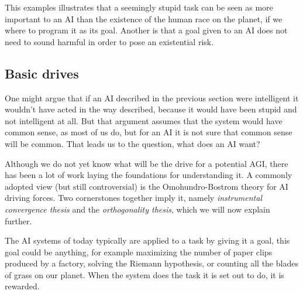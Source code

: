 \documentclass[12pt,A4]{report}
\theoremstyle{definition}
\begin{document}
This examples illustrates that a seemingly stupid task can be seen as more important to an AI than the existence of the human race on the planet, if we where to program it as its goal. Another is that a goal given to an AI does not need to sound harmful in order to pose an existential risk. 

\subsection{Basic drives}
One might argue that if an AI described in the previous section were intelligent it wouldn't have acted in the way described, because it would have been stupid and not intelligent at all. But that argument assumes that the system would have common sense, as most of us do, but for an AI it is not sure that common sense will be common. That leads us to the question, what does an AI want?

Although we do not yet know what will be the drive for a potential AGI, there has been a lot of work laying the foundations for understanding it. A commonly adopted view (but still controversial) is the Omohundro-Bostrom theory for AI driving forces. Two cornerstones together imply it, namely \textit{instrumental convergence thesis} and the \textit{orthogonality thesis}, which we will now explain further.

The AI systems of today typically are applied to a task by giving it a goal, this goal could be anything, for example maximizing the number of paper clips produced by a factory, solving the Riemann hypothesis, or counting all the blades of grass on our planet. When the system does the task it is set out to do, it is rewarded.
\end{document}
